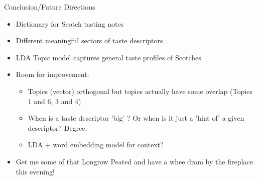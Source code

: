 \documentclass{beamer}
\begin{document}
\begin{frame}{Conclusion/Future Directions}
\begin{itemize}
	\item Dictionary for Scotch tasting notes
	\item Different meaningful sectors of taste descriptors
	\item LDA Topic model captures general taste profiles of Scotches
	\item Room for improvement:
	\begin{itemize}
		\item Topics (vector) orthogonal but topics actually have some overlap (Topics 1 and 6, 3 and 4)
		\item When is a taste descriptor 'big' ? Or when is it just a 'hint of' a given descriptor? Degree.
		\item LDA + word embedding model for context?
	\end{itemize}
\item Get me some of that Longrow Peated and have a whee dram by the fireplace this evening!
\end{itemize}

\end{frame}
\end{document}
